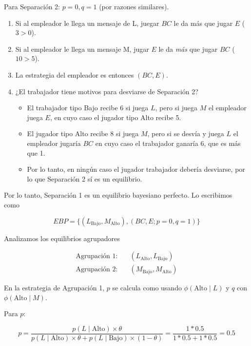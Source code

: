 \documentclass[12pt]{article}
\begin{document}
Para Separación 2: $ p=0, q=1 $ (por razones similares).

\begin{enumerate}
	\setlength{\itemsep}{0pt}
	\setlength{\parskip}{0pt}
	\setlength{\parsep}{0pt}
		\item Si al empleador le llega un mensaje de L, juegar $ BC $ le da más que jugar $ E $ ($ 3 > 0 $).
		\item Si al empleador le llega un mensaje M, jugar $ E $ le da \textit{más} que jugar $ BC $ ($ 10 > 5 $).
		\item La estrategia del empleador es entonces $( BC, E )$.
		\item ¿El trabajador tiene motivos para desviarse de Separación 2?
		\begin{itemize}
		\setlength{\itemsep}{0pt}
		\setlength{\parskip}{0pt}
		\setlength{\parsep}{0pt}
			\item El trabajador tipo Bajo recibe 6 si juega $ L $, pero si juega $ M $ el empleador juega $ E $, en cuyo caso el jugador tipo Alto recibe 5. 
			\item El jugador tipo Alto recibe 8 si juega $ M $, pero si se desvía y juega $ L $ el empleador jugaría $ BC $ en cuyo caso el trabajador ganaría 6, que es más que 1. 
			\item Por lo tanto, en ningún caso el jugador trabajador debería desviarse, por lo que Separación 2 sí es un equilibrio.
		\end{itemize} 
	\end{enumerate}

	Por lo tanto, Separación 1 es un equilibrio bayesiano perfecto. Lo escribimos como

	\[
	EBP = \{(L_{\text{Bajo}}, M_{\text{Alto}}), (BC, E; p = 0, q = 1)\}	
	\]


Analizamos los equilibrios agrupadores

\begin{align*}
	\text{Agrupación 1:}\quad &(L_{\text{Alto}}, L_{\text{Bajo}})\\
	\text{Agrupación 2:}\quad &(M_{\text{Bajo}}, M_{\text{Alto}})
\end{align*}

En la estrategia de Agrupación 1, $ p $ se calcula como usando $ \phi(\text{Alto}\mid L) $ y $ q $ con $ \phi(\text{Alto}\mid M) $. 

Para $ p $:

\[
p = 	\frac{p(L\mid \text{Alto})\times\theta}{p(L\mid \text{Alto})\times\theta+p(L\mid \text{Bajo})\times(1-\theta)} = \frac{1 * 0.5}{1*0.5 + 1*0.5} = 0.5
\]
\end{document}

